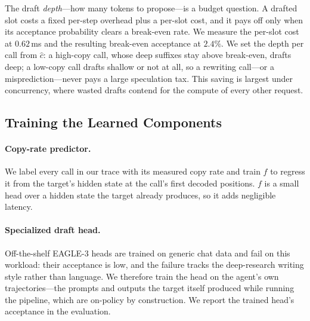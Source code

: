 The draft \emph{depth}---how many tokens to propose---is a budget question. A drafted slot costs a fixed per-step overhead plus a per-slot cost, and it pays off only when its acceptance probability clears a break-even rate. We measure the per-slot cost at $0.62$\,ms and the resulting break-even acceptance at $2.4\%$. We set the depth per call from $\hat c$: a high-copy call, whose deep suffixes stay above break-even, drafts deep; a low-copy call drafts shallow or not at all, so a rewriting call---or a misprediction---never pays a large speculation tax. This saving is largest under concurrency, where wasted drafts contend for the compute of every other request.

\subsection{Training the Learned Components}
\label{sec:training}

\paragraph{Copy-rate predictor.}
We label every call in our trace with its measured copy rate and train $f$ to regress it from the target's hidden state at the call's first decoded positions. $f$ is a small head over a hidden state the target already produces, so it adds negligible latency.

\paragraph{Specialized draft head.}
Off-the-shelf EAGLE-3 heads are trained on generic chat data and fail on this workload: their acceptance is low, and the failure tracks the deep-research writing style rather than language. We therefore train the head on the agent's own trajectories---the prompts and outputs the target itself produced while running the pipeline, which are on-policy by construction. We report the trained head's acceptance in the evaluation.
